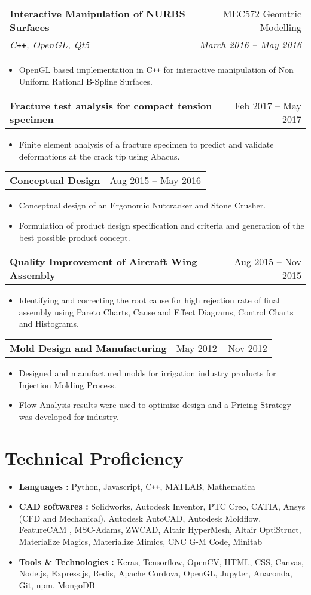 \documentclass[letterpaper,10pt]{article}
\makeatletter
\newcommand{\resumeHeading}[4]{
  \vspace{-1pt}
    \begin{tabular*}{0.97\textwidth}{l@{\extracolsep{\fill}}r}
      \textbf{#1} & #2 \vspace{-2pt}\\ \vspace{1pt}
      \textit{\small#3} & \textit{\small #4} \\
    \end{tabular*}
}
\newcommand{\resumeHeadingwithDate}[2]{
	\vspace{-1pt}
	\begin{tabular*}{0.97\textwidth}{l@{\extracolsep{\fill}}r}
		\textbf{#1} & #2 \vspace{-2pt}\\
	\end{tabular*}
	\vspace{+2pt}
}
\newcommand{\resumeSection}[1]{
\vspace{-12pt}
\section{\textbf{#1}}
}
\newcommand{\resumeItemListStart}{
\vspace{-7pt}
\begin{itemize}[leftmargin=14pt]
}
\newcommand{\resumeItemListEnd}{
\vspace{+7pt}
\end{itemize}
}
\newcommand{\resumeItem}[1]{
  \item\small{
      {#1 \vspace{-7pt}
      }
  }
}
\makeatother
\begin{document}
	\vspace{-2pt}
	\resumeHeading{Interactive Manipulation of NURBS Surfaces}{MEC572 Geomtric Modelling}{C\texttt{++}, OpenGL, Qt5}{March 2016 -- May 2016}
	\resumeItemListStart
	\resumeItem{OpenGL based implementation in C\texttt{++} for interactive manipulation of Non Uniform Rational B-Spline Surfaces.}
	\resumeItemListEnd
	
	\resumeHeadingwithDate{Fracture test analysis for compact tension specimen}{Feb 2017 -- May 2017}
	\resumeItemListStart
	\resumeItem{Finite element analysis of a fracture specimen to predict and validate deformations at the crack tip using Abacus.}
	\resumeItemListEnd
	
	\vspace{-4pt}
	\resumeHeadingwithDate{Conceptual Design}{Aug 2015 -- May 2016}
	\resumeItemListStart
	\resumeItem{Conceptual design of an Ergonomic Nutcracker and Stone Crusher.}
	\resumeItem{Formulation of product design specification and criteria and generation of the best possible product concept.}
	\resumeItemListEnd
	
	\vspace{-4pt}
	\resumeHeadingwithDate{Quality Improvement of Aircraft Wing Assembly}{Aug 2015 -- Nov 2015}
	\resumeItemListStart
	\resumeItem{Identifying and correcting the root cause for high rejection rate of final assembly using Pareto Charts, Cause and Effect Diagrams, Control Charts and Histograms.}
	\resumeItemListEnd
	
	\vspace{-4pt}
	\resumeHeadingwithDate{Mold Design and Manufacturing}{May 2012 -- Nov 2012}
	\resumeItemListStart
	\resumeItem{Designed and manufactured molds for irrigation industry products for Injection Molding Process.}
	\resumeItem{Flow Analysis results were used to optimize design and a Pricing Strategy was developed for industry.}
	\resumeItemListEnd
    
    
    
\resumeSection{Technical Proficiency}
    \vspace{+7pt}
    \resumeItemListStart
    \resumeItem{\textbf{Languages :} Python, Javascript, C\texttt{++}, MATLAB, Mathematica}
    \resumeItem{\textbf{CAD softwares :} Solidworks, Autodesk Inventor, PTC Creo, CATIA, Ansys (CFD and Mechanical), Autodesk AutoCAD, Autodesk Moldflow, FeatureCAM , MSC-Adams, ZWCAD, Altair HyperMesh, Altair OptiStruct, Materialize Magics, Materialize Mimics, CNC G-M Code, Minitab}
    \resumeItem{\textbf{Tools \& Technologies :} Keras, Tensorflow, OpenCV, HTML, CSS, Canvas, Node.js, Express.js, Redis, Apache Cordova, OpenGL, Jupyter, Anaconda, Git, npm, MongoDB}
    \resumeItemListEnd
    
\end{document}
